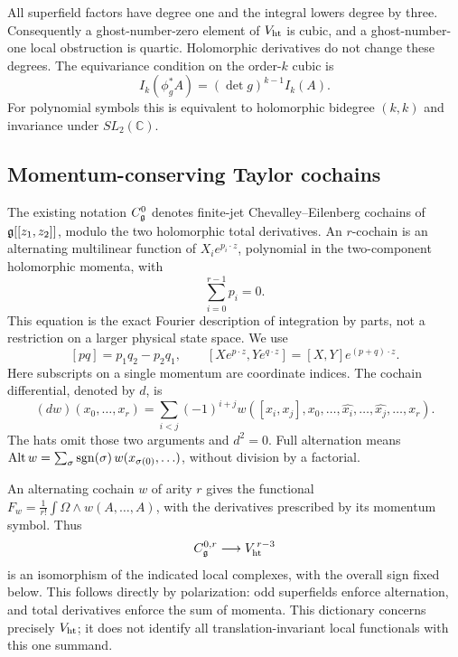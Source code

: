 All superfield factors have degree one and the integral lowers
degree by three. Consequently a ghost-number-zero element of
$V_{\mathrm{ht}}$ is cubic, and a ghost-number-one local obstruction is
quartic. Holomorphic derivatives do not change these degrees.
The equivariance condition on the order-$k$ cubic is
\[
 I_k(\phi_g^*A)=(\det g)^{k-1}I_k(A).
\]
For polynomial symbols this is equivalent to holomorphic
bidegree $(k,k)$ and invariance under $SL_2(\mathbb C)$.

\subsection{Momentum-conserving Taylor cochains}

The existing notation $C^0_{\mathfrak g}$ denotes finite-jet
Chevalley--Eilenberg cochains of $\mathfrak g[[z_1,z_2]]$, modulo the two
holomorphic total derivatives. An $r$-cochain is an alternating
multilinear function of $X_i e^{p_i\cdot z}$, polynomial in the
two-component holomorphic momenta, with
\[
 \sum_{i=0}^{r-1}p_i=0.
\]
This equation is the exact Fourier description of integration
by parts, not a restriction on a larger physical state space.
We use
\[
 [pq]=p_1q_2-p_2q_1,\qquad
 [Xe^{p\cdot z},Ye^{q\cdot z}]=[X,Y]e^{(p+q)\cdot z}.
\]
Here subscripts on a single momentum are coordinate indices.
The cochain differential, denoted by $d$, is
\begin{equation}\label{eq:CE}
 (d w)(x_0,\ldots,x_r)=
 \sum_{i<j}(-1)^{i+j}
 w([x_i,x_j],x_0,\ldots,\widehat{x_i},\ldots,
                      \widehat{x_j},\ldots,x_r).
\end{equation}
The hats omit those two arguments and $d^2=0$.
Full alternation means
$\operatorname{Alt} w=\sum_{\sigma}\operatorname{sgn}(\sigma)\,w(x_{\sigma(0)},\ldots)$,
without division by a factorial.

An alternating cochain $w$ of arity $r$ gives the functional
$F_w=\frac1{r!}\int\Omega\wedge w(A,\ldots,A)$, with the
derivatives prescribed by its momentum symbol. Thus
\[
 C^{0,r}_{\mathfrak g}\longrightarrow V_{\mathrm{ht}}^{\,r-3}
\]
is an isomorphism of the indicated local complexes, with the
overall sign fixed below. This follows directly by polarization:
odd superfields enforce alternation, and total derivatives
enforce the sum of momenta. This dictionary concerns precisely
$V_{\mathrm{ht}}$; it does not identify all translation-invariant local
functionals with this one summand.

